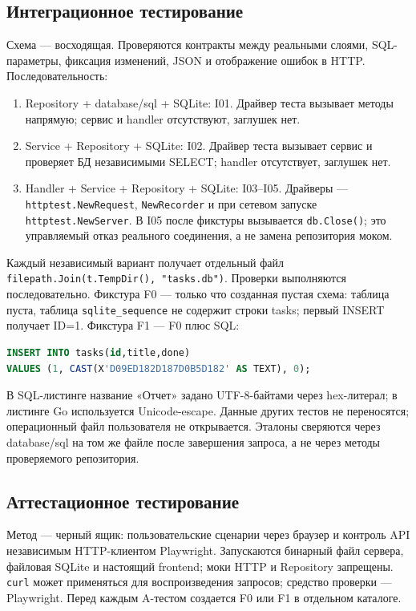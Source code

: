 \documentclass[12pt,a4paper]{extarticle}
\newcommand{\code}[1]{\nolinkurl{#1}}
\begin{document}
\subsection{Интеграционное тестирование}
Схема --- восходящая. Проверяются контракты между реальными слоями,
SQL-параметры, фиксация изменений, JSON и отображение ошибок в HTTP.
Последовательность:
\begin{enumerate}
\item Repository + database/sql + SQLite: I01.
Драйвер теста вызывает методы напрямую; сервис и handler отсутствуют,
заглушек нет.
\item Service + Repository + SQLite: I02.
Драйвер теста вызывает сервис и проверяет БД независимыми SELECT;
handler отсутствует, заглушек нет.
\item Handler + Service + Repository + SQLite: I03--I05.
Драйверы --- \code{httptest.NewRequest}, \code{NewRecorder}
и при сетевом запуске \code{httptest.NewServer}.
В I05 после фикстуры вызывается \code{db.Close()}; это управляемый отказ
реального соединения, а не замена репозитория моком.
\end{enumerate}

Каждый независимый вариант получает отдельный файл
\code{filepath.Join(t.TempDir(), "tasks.db")}. Проверки выполняются
последовательно. Фикстура F0 --- только что созданная пустая схема:
таблица пуста, таблица \code{sqlite_sequence} не содержит строки tasks;
первый INSERT получает ID=1. Фикстура F1 --- F0 плюс SQL:
\begin{lstlisting}[language=SQL]
INSERT INTO tasks(id,title,done)
VALUES (1, CAST(X'D09ED182D187D0B5D182' AS TEXT), 0);
\end{lstlisting}
В SQL-листинге название «Отчет» задано UTF-8-байтами через hex-литерал;
в листинге Go используется Unicode-escape.
Данные других тестов не переносятся; операционный файл пользователя
не открывается. Эталоны сверяются через database/sql на том же файле
после завершения запроса, а не через методы проверяемого репозитория.

\subsection{Аттестационное тестирование}
Метод --- черный ящик: пользовательские сценарии через браузер
и контроль API независимым HTTP-клиентом Playwright.
Запускаются бинарный файл сервера, файловая SQLite и настоящий frontend;
моки HTTP и Repository запрещены. \code{curl} может применяться для
воспроизведения запросов; средство проверки --- Playwright.
Перед каждым A-тестом создается F0 или F1 в отдельном каталоге.
\end{document}
